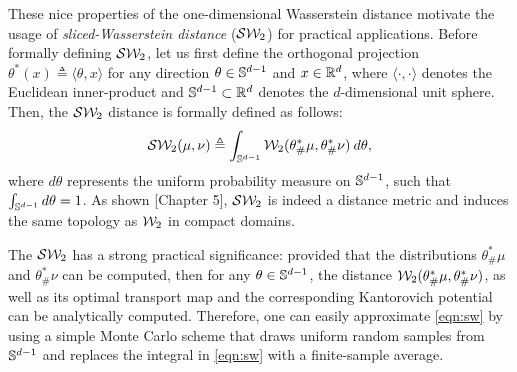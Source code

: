 These nice properties of the one-dimensional Wasserstein distance motivate the usage of \emph{sliced-Wasserstein distance} (${\cal S}{\cal W}_2$) for practical applications. Before formally defining ${\cal S}{\cal W}_2$, let us first define the orthogonal projection $\theta^* (x) \triangleq \langle \theta, x \rangle$ for any direction $\theta \in \mathbb{S}^{d-1}$ and $x \in \mathbb{R}^d$, where $\langle \cdot, \cdot \rangle$ denotes the Euclidean inner-product and $\mathbb{S}^{d-1} \subset \mathbb{R}^d$ denotes the $d$-dimensional unit sphere. Then, the ${\cal S}{\cal W}_2$ distance is formally defined as follows:
\begin{align}
{\cal S}{\cal W}_2(\mu,\nu) \triangleq \int_{\mathbb{S}^{d-1}} {\cal W}_2 (\theta^*_\#\mu, \theta^*_\#\nu) \> d \theta, \label{eqn:sw}
\end{align}
where $d\theta$ represents the uniform probability measure on $\mathbb{S}^{d-1}$, such that $\int_{\mathbb{S}^{d-1}} d \theta = 1$. As shown \cite{bonnotte2013unidimensional}[Chapter 5], ${\cal S}{\cal W}_2$ is indeed a distance metric and induces the same topology as ${\cal W}_2$ in compact domains. 

The ${\cal S}{\cal W}_2$ has a strong practical significance: provided that the distributions $\theta^*_\#\mu$ and $\theta^*_\#\nu$ can be computed, then for any $\theta \in \mathbb{S}^{d-1}$, the distance ${\cal W}_2 (\theta^*_\#\mu, \theta^*_\#\nu)$, as well as its optimal transport map and the corresponding Kantorovich potential can be analytically computed. Therefore, one can easily approximate \eqref{eqn:sw} by using a simple Monte Carlo scheme that draws uniform random samples from $\mathbb{S}^{d-1}$ and replaces the integral in \eqref{eqn:sw} with a finite-sample average. 





